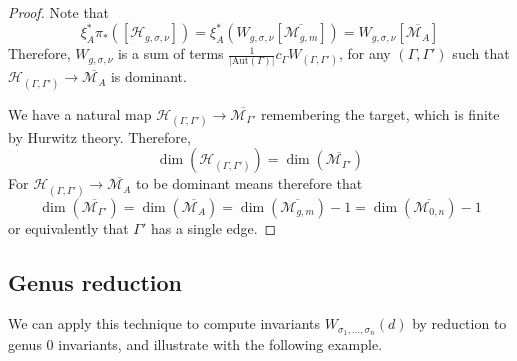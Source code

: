 \documentclass[11pt]{article}           %
\newcommand{\Aut}{\text{Aut}}
\theoremstyle{definition}
\begin{document}
\begin{proof}
  Note that
  \[
  \xi_A^*\pi_*([\mathcal H_{g,\sigma,\nu}]) =
  \xi_A^*(W_{g,\sigma,\nu}[\overline{\mathcal M_{g,m}}])=
  W_{g,\sigma,\nu}[\overline{\mathcal M_A}]
  \]
  Therefore, $W_{g,\sigma,\nu}$ is a sum of
  terms $\frac 1{|\Aut(\Gamma)|}c_{\Gamma}W_{(\Gamma,\Gamma')}$, for
  any $(\Gamma,\Gamma')$ such that
  $\mathcal H_{(\Gamma,\Gamma')}\to\overline{\mathcal M_A}$
  is dominant.

  We have a natural map $\mathcal H_{(\Gamma,\Gamma')}\to \overline{\mathcal M_{\Gamma'}}$ remembering the target, which is finite by Hurwitz theory. Therefore,
  \[
  \dim(\mathcal H_{(\Gamma,\Gamma')})=\dim(\overline{\mathcal M_{\Gamma'}})
  \]
  For $\mathcal H_{(\Gamma,\Gamma')}\to\overline{\mathcal M_A}$ to be
  dominant means therefore that
  \[
  \dim(\overline{\mathcal M_{\Gamma'}})=\dim(\overline{\mathcal M_A})=
  \dim(\overline{\mathcal M_{g,m}})-1=\dim(\overline{\mathcal M_{0,n}})-1
  \]
  or equivalently that $\Gamma'$ has a single edge.
\end{proof}

\subsection{Genus reduction}

We can apply this technique to compute invariants $W_{\sigma_1,\dots,\sigma_n}(d)$ by reduction to
genus $0$ invariants, and illustrate with the following example.
\end{document}
